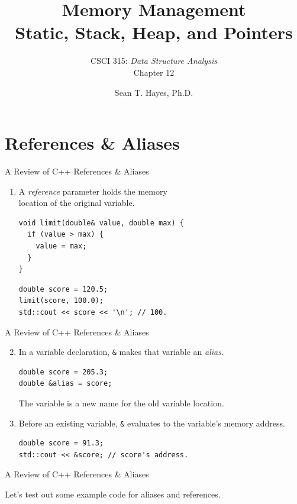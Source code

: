 \documentclass[14pt,aspectratio=1610]{beamer}
\title{\Huge{}{Memory Management}\\\Large{}Static, Stack, Heap, and Pointers}
\subtitle{CSCI 315: \textit{Data Structure Analysis}\\Chapter 12}
\author{Sean T. Hayes, Ph.D.}
\institute{Charleston Southern University}
\begin{document}
\begin{frame}
  \titlepage{}
\end{frame}

\section{References \& Aliases}
\begin{frame}[fragile]{A Review of C++ References \& Aliases}
\begin{enumerate}
\item 
  A \textit{reference} parameter holds the memory \\
  location of the original variable.

\begin{lstlisting}
void limit(double& value, double max) {
  if (value > max) {
    value = max;
  }
}
\end{lstlisting}

\begin{lstlisting}
double score = 120.5;
limit(score, 100.0);
std::cout << score << '\n'; // 100.
\end{lstlisting}
\end{enumerate}
\end{frame}

\begin{frame}[fragile]{A Review of C++ References \& Aliases}
\begin{enumerate}[<+->]
  \setcounter{enumi}{1}

\item
  In a variable declaration, \lstinline{&} makes that variable an \textit{alias}.\\
  \begin{lstlisting}
double score = 205.3;
double &alias = score;
\end{lstlisting}
  The variable is a new name for the old variable location.

\item
  Before an existing variable, \lstinline{&} evaluates to the variable's memory address.\\
  \begin{lstlisting}
double score = 91.3;
std::cout << &score; // score's address.
\end{lstlisting}
\end{enumerate}
\end{frame}

\begin{frame}{A Review of C++ References \& Aliases}
  \begin{center}\Large
  Let's test out some example code for aliases and references.
\end{center}
\end{frame}
\end{document}
